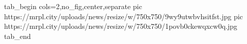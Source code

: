  
 
 
 
 


\ifcmt
  tab_begin cols=2,no_fig,center,separate
     pic https://mrpl.city/uploads/news/resize/w/750x750/9wy9utwbvhsitfst.jpg
     pic https://mrpl.city/uploads/news/resize/w/750x750/1povb0ckewqxcw0q.jpg
  tab_end
\fi
